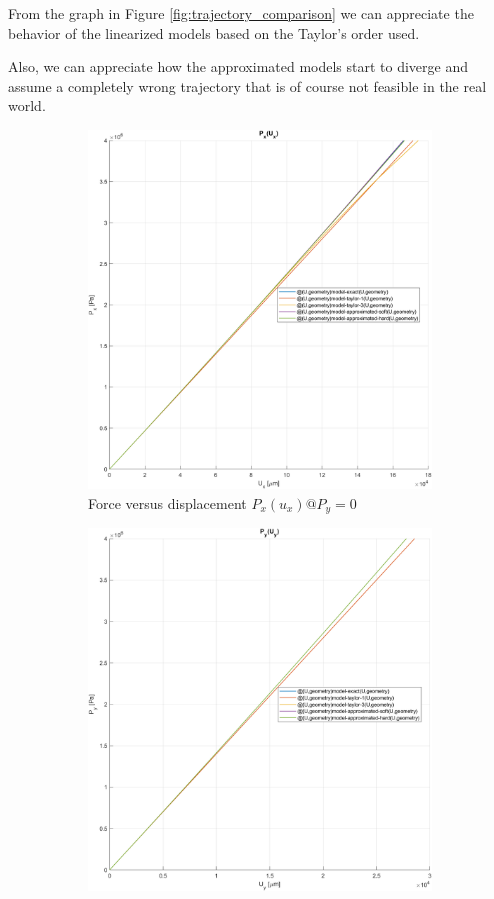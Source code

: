 From the graph in Figure \ref{fig:trajectory_comparison} we can appreciate the behavior of the linearized models based on the Taylor's order used.

Also, we can appreciate how the approximated models start to diverge and assume a completely wrong trajectory that is of course not feasible in the real world.

\begin{figure}[H]
    \centering
    \begin{subfigure}[b]{0.45\textwidth}
        \centering
        \includegraphics[width=.9\textwidth]{img/force_versus_displacement_Px5000000_Py0}
        \caption{Force versus displacement $P_x(u_x) @ P_y = 0$}
        \label{fig:force_versus_displacement_Px5000000_Py0}
    \end{subfigure}
    \hfill
    \begin{subfigure}[b]{0.45\textwidth}
        \centering
        \includegraphics[width=.9\textwidth]{img/force_versus_displacement_Px0_Py5000000}

\end{subfigure}
\end{figure}
